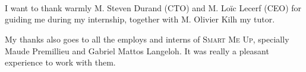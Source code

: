 \documentclass[a4paper,11pt]{custom}
\newcommand{\smu}{\textsc{Smart Me Up}\xspace}
\begin{document}
~
\thispagestyle{empty}

%
\headerleftcontent{\headerlefttext}%
\headerrightcontent{\headerrighttext}%
\myfootrulebegin[-.5cm]
\myfootruleend

~

\clearpage


~

\vspace{\fill}
\begin{flushright}
\begin{minipage}[b]{7cm}
I want to thank warmly M. Steven Durand (CTO) and M. Loïc Lecerf (CEO) for
guiding me during my internship, together with M. Olivier Kilh my tutor.

\vspace{0.5em}

My thanks also goes to all the employs and interns of \smu, specially Maude
Premillieu and Gabriel Mattos Langeloh. It was really a pleasant experience to
work with them.
\end{minipage}
\end{flushright}
\vspace{\fill}
\vspace{\fill}


\newpage
~
\newpage

%
%
%
%
%
%
%
%
%


\end{document}
